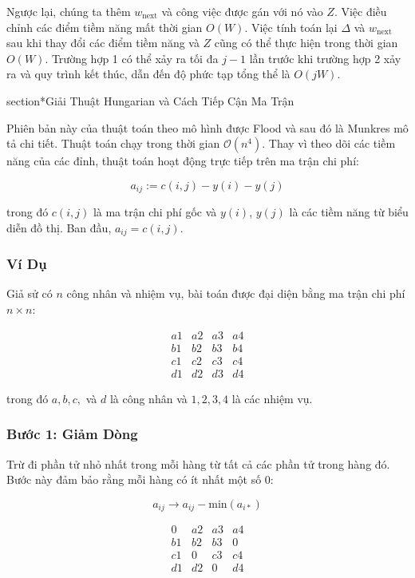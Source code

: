 Ngược lại, chúng ta thêm \( w_{\text{next}} \) và công việc được gán với nó vào \( Z \). Việc điều chỉnh các điểm tiềm năng mất thời gian \( O(W) \). Việc tính toán lại \( \Delta \) và \( w_{\text{next}} \) sau khi thay đổi các điểm tiềm năng và \( Z \) cũng có thể thực hiện trong thời gian \( O(W) \). Trường hợp 1 có thể xảy ra tối đa \( j-1 \) lần trước khi trường hợp 2 xảy ra và quy trình kết thúc, dẫn đến độ phức tạp tổng thể là \( O(jW) \).

section*{Giải Thuật Hungarian và Cách Tiếp Cận Ma Trận}

Phiên bản này của thuật toán theo mô hình được Flood và sau đó là Munkres mô tả chi tiết. Thuật toán chạy trong thời gian \(\mathcal{O}(n^4)\). Thay vì theo dõi các tiềm năng của các đỉnh, thuật toán hoạt động trực tiếp trên ma trận chi phí:

\[
a_{ij} := c(i,j) - y(i) - y(j)
\]

trong đó \(c(i,j)\) là ma trận chi phí gốc và \(y(i)\), \(y(j)\) là các tiềm năng từ biểu diễn đồ thị. Ban đầu, \(a_{ij} = c(i,j)\).

\subsubsection*{Ví Dụ}

Giả sử có \(n\) công nhân và nhiệm vụ, bài toán được đại diện bằng ma trận chi phí \(n \times n\):

\[
\begin{matrix}
a1 & a2 & a3 & a4 \\
b1 & b2 & b3 & b4 \\
c1 & c2 & c3 & c4 \\
d1 & d2 & d3 & d4
\end{matrix}
\]

trong đó \(a, b, c,\) và \(d\) là công nhân và \(1, 2, 3, 4\) là các nhiệm vụ.

\subsubsection*{Bước 1: Giảm Dòng}

Trừ đi phần tử nhỏ nhất trong mỗi hàng từ tất cả các phần tử trong hàng đó. Bước này đảm bảo rằng mỗi hàng có ít nhất một số 0:

\[
a_{ij} \rightarrow a_{ij} - \text{min}(a_{i*})
\]

\[
\begin{matrix}
0 & a2 & a3 & a4 \\
b1 & b2 & b3 & 0 \\
c1 & 0 & c3 & c4 \\
d1 & d2 & 0 & d4
\end{matrix}
\]

